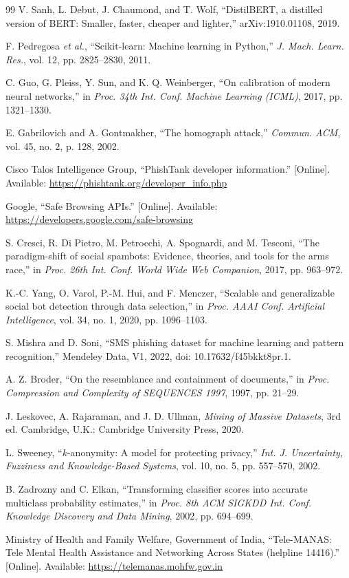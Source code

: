 \begin{thebibliography}{99}
 V. Sanh, L. Debut, J. Chaumond, and T. Wolf, ``DistilBERT, a distilled version of BERT: Smaller, faster, cheaper and lighter,'' arXiv:1910.01108, 2019.

 F. Pedregosa \textit{et al.}, ``Scikit-learn: Machine learning in Python,'' \textit{J. Mach. Learn. Res.}, vol. 12, pp. 2825--2830, 2011.

 C. Guo, G. Pleiss, Y. Sun, and K. Q. Weinberger, ``On calibration of modern neural networks,'' in \textit{Proc. 34th Int. Conf. Machine Learning (ICML)}, 2017, pp. 1321--1330.

 E. Gabrilovich and A. Gontmakher, ``The homograph attack,'' \textit{Commun. ACM}, vol. 45, no. 2, p. 128, 2002.

 Cisco Talos Intelligence Group, ``PhishTank developer information.'' [Online]. Available: \url{https://phishtank.org/developer_info.php}

 Google, ``Safe Browsing APIs.'' [Online]. Available: \url{https://developers.google.com/safe-browsing}

 S. Cresci, R. Di Pietro, M. Petrocchi, A. Spognardi, and M. Tesconi, ``The paradigm-shift of social spambots: Evidence, theories, and tools for the arms race,'' in \textit{Proc. 26th Int. Conf. World Wide Web Companion}, 2017, pp. 963--972.

 K.-C. Yang, O. Varol, P.-M. Hui, and F. Menczer, ``Scalable and generalizable social bot detection through data selection,'' in \textit{Proc. AAAI Conf. Artificial Intelligence}, vol. 34, no. 1, 2020, pp. 1096--1103.

 S. Mishra and D. Soni, ``SMS phishing dataset for machine learning and pattern recognition,'' Mendeley Data, V1, 2022, doi: 10.17632/f45bkkt8pr.1.

 A. Z. Broder, ``On the resemblance and containment of documents,'' in \textit{Proc. Compression and Complexity of SEQUENCES 1997}, 1997, pp. 21--29.

 J. Leskovec, A. Rajaraman, and J. D. Ullman, \textit{Mining of Massive Datasets}, 3rd ed. Cambridge, U.K.: Cambridge University Press, 2020.

 L. Sweeney, ``$k$-anonymity: A model for protecting privacy,'' \textit{Int. J. Uncertainty, Fuzziness and Knowledge-Based Systems}, vol. 10, no. 5, pp. 557--570, 2002.

 B. Zadrozny and C. Elkan, ``Transforming classifier scores into accurate multiclass probability estimates,'' in \textit{Proc. 8th ACM SIGKDD Int. Conf. Knowledge Discovery and Data Mining}, 2002, pp. 694--699.

 Ministry of Health and Family Welfare, Government of India, ``Tele-MANAS: Tele Mental Health Assistance and Networking Across States (helpline 14416).'' [Online]. Available: \url{https://telemanas.mohfw.gov.in}

\end{thebibliography}
